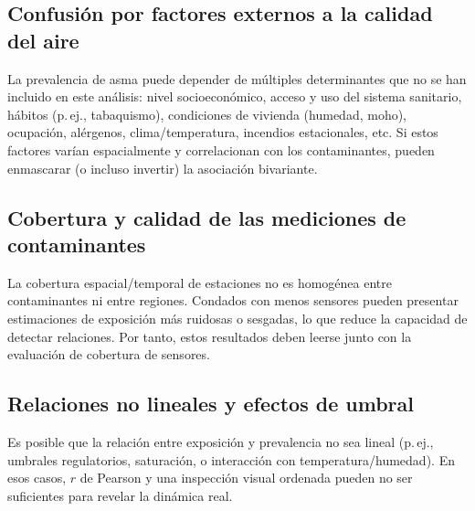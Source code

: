 \subsection{Confusión por factores externos a la calidad del aire}
La prevalencia de asma puede depender de múltiples determinantes que no se han incluido en este análisis:
nivel socioeconómico, acceso y uso del sistema sanitario, hábitos (p.\,ej., tabaquismo), condiciones de vivienda
(humedad, moho), ocupación, alérgenos, clima/temperatura, incendios estacionales, etc. Si estos factores varían
espacialmente y correlacionan con los contaminantes, pueden enmascarar (o incluso invertir) la asociación bivariante.

\subsection{Cobertura y calidad de las mediciones de contaminantes}
La cobertura espacial/temporal de estaciones no es homogénea entre contaminantes ni entre regiones. Condados con
menos sensores pueden presentar estimaciones de exposición más ruidosas o sesgadas, lo que reduce la capacidad de
detectar relaciones. Por tanto, estos resultados deben leerse junto con la evaluación de cobertura de sensores.

\subsection{Relaciones no lineales y efectos de umbral}
Es posible que la relación entre exposición y prevalencia no sea lineal (p.\,ej., umbrales regulatorios, saturación,
o interacción con temperatura/humedad). En esos casos, $r$ de Pearson y una inspección visual ordenada pueden no ser
suficientes para revelar la dinámica real.

